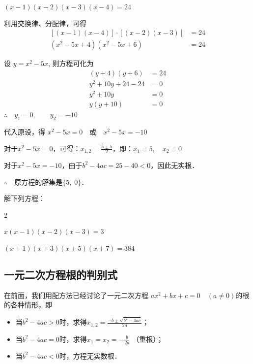 \begin{solution}
    $(x-1)(x-2)(x-3)(x-4)=24$

    利用交换律、分配律，可得
    \[\begin{split}
        [(x-1)(x-4)]\cdot [(x-2)(x-3)]&=24\\
(x^2-5x+4)(x^2-5x+6)&=24
    \end{split}\]
    
    设 $y=x^2-5x$, 则方程可化为
   \[\begin{split}
       (y+4)(y+6)&=24\\
    y^2+10y+24-24&=0\\
    y^2+10y&=0\\
    y(y+10)&=0  
   \end{split}\]
   $\therefore\quad y_1=0,\qquad y_2=-10$

   代入原设，得
   $x^2-5x=0\quad \text{或}\quad    x^2-5x=-10$
   
   对于$x^2-5x=0$，可得：$x_{1,2}=\frac{5\pm 5}{2}$，即：$x_1=5,\quad x_2=0$

   对于$x^2-5x=-10$，由于$b^2-4ac=25-40<0$，因此无实根．

   $\therefore\quad $原方程的解集是$\{5,\; 0\}$．
\end{solution}

\begin{ex}
 解下列方程：   
\begin{enumerate}
    \begin{multicols}{2}
        \item $x(x-1)(x-2)(x-3)=3$
    \item $(x+1)(x+3)(x+5)(x+7)=384$
    \end{multicols}
\end{enumerate}
\end{ex}

\subsection{一元二次方程根的判别式}
在前面，我们用配方法已经讨论了一元二次方程
$ax^2+bx+c=0\quad (a\ne 0)$的根的各种情形，即
\begin{itemize}
    \item 当$b^2-4ac>0$时，求得$x_{1,2}=\frac{-b\pm\sqrt{b^2-4ac}}{2a}$；
\item     当$b^2-4ac=0$时，求得$x_1=x_2=-\frac{b}{2a}$ （重根）；
\item     当$b^2-4ac<0$时，方程无实数根．
\end{itemize}

